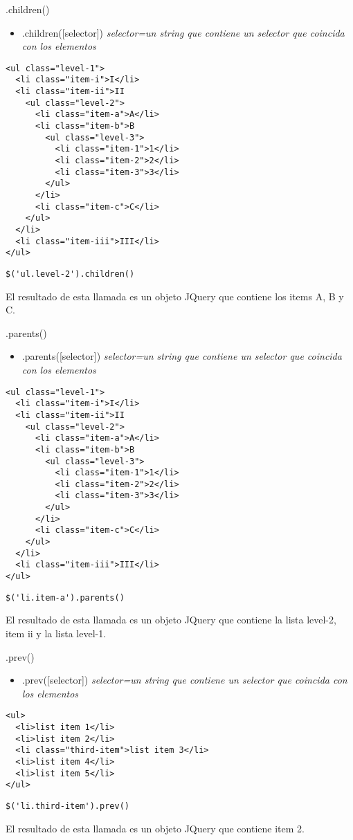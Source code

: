 \begin{frame}[fragile]{.children()} %
\begin{itemize}
    \item .children([selector]) \textit{ selector=un string que contiene un selector que coincida con los elementos }
\end{itemize}
\begin{lstlisting}
<ul class="level-1">
  <li class="item-i">I</li>
  <li class="item-ii">II
    <ul class="level-2">
      <li class="item-a">A</li>
      <li class="item-b">B
        <ul class="level-3">
          <li class="item-1">1</li>
          <li class="item-2">2</li>
          <li class="item-3">3</li>
        </ul>
      </li>
      <li class="item-c">C</li>
    </ul>
  </li>
  <li class="item-iii">III</li>
</ul>
\end{lstlisting}
\begin{lstlisting}
$('ul.level-2').children()
\end{lstlisting}
El resultado de esta llamada es un objeto JQuery que contiene los items A, B y C.
\end{frame}

\begin{frame}[fragile]{.parents()} %
\begin{itemize}
    \item .parents([selector]) \textit{ selector=un string que contiene un selector que coincida con los elementos }
\end{itemize}
\begin{lstlisting}
<ul class="level-1">
  <li class="item-i">I</li>
  <li class="item-ii">II
    <ul class="level-2">
      <li class="item-a">A</li>
      <li class="item-b">B
        <ul class="level-3">
          <li class="item-1">1</li>
          <li class="item-2">2</li>
          <li class="item-3">3</li>
        </ul>
      </li>
      <li class="item-c">C</li>
    </ul>
  </li>
  <li class="item-iii">III</li>
</ul>
\end{lstlisting}
\begin{lstlisting}
$('li.item-a').parents()
\end{lstlisting}
El resultado de esta llamada es un objeto JQuery que contiene la lista level-2,
item ii y la lista level-1.
\end{frame}

\begin{frame}[fragile]{.prev()} %
\begin{itemize}
    \item .prev([selector]) \textit{ selector=un string que contiene un selector que coincida con los elementos }
\end{itemize}
\begin{lstlisting}
<ul>
  <li>list item 1</li>
  <li>list item 2</li>
  <li class="third-item">list item 3</li>
  <li>list item 4</li>
  <li>list item 5</li>
</ul>
\end{lstlisting}
\begin{lstlisting}
$('li.third-item').prev()
\end{lstlisting}
El resultado de esta llamada es un objeto JQuery que contiene item 2.
\end{frame}

